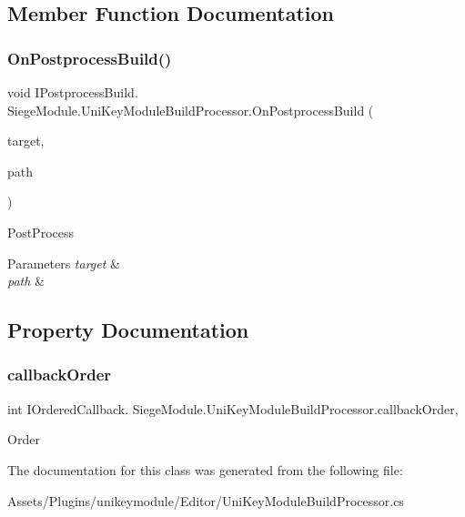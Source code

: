 \subsection{Member Function Documentation}
\mbox{\label{class_siege_module_1_1_uni_key_module_build_processor_a77a134492161b03b27b431bcfbf83011}} 
\subsubsection{\texorpdfstring{On\+Postprocess\+Build()}{OnPostprocessBuild()}}
{\footnotesize\ttfamily void I\+Postprocess\+Build. Siege\+Module.\+Uni\+Key\+Module\+Build\+Processor.\+On\+Postprocess\+Build (\begin{DoxyParamCaption}\item[{Build\+Target}]{target,  }\item[{string}]{path }\end{DoxyParamCaption})\hspace{0.3cm}{\ttfamily [private]}}



Post\+Process 


\begin{DoxyParams}{Parameters}
{\em target} & \\
\hline
{\em path} & \\
\hline
\end{DoxyParams}


\subsection{Property Documentation}
\mbox{\label{class_siege_module_1_1_uni_key_module_build_processor_ac8a224393b5e14a918f7b83c11e52d4d}} 
\subsubsection{\texorpdfstring{callback\+Order}{callbackOrder}}
{\footnotesize\ttfamily int I\+Ordered\+Callback. Siege\+Module.\+Uni\+Key\+Module\+Build\+Processor.\+callback\+Order\hspace{0.3cm}{\ttfamily [get]}, {\ttfamily [private]}}



Order 



The documentation for this class was generated from the following file\+:\begin{DoxyCompactItemize}
\item 
Assets/\+Plugins/unikeymodule/\+Editor/Uni\+Key\+Module\+Build\+Processor.\+cs\end{DoxyCompactItemize}

